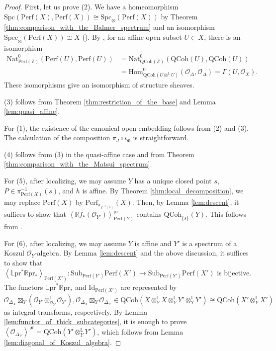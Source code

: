 \documentclass[11pt]{amsart}
\theoremstyle{definition}
\theoremstyle{plain}
\theoremstyle{remark}
\newcommand{\perf}{\mathrm{Perf}}
\newcommand{\qcoh}{\mathrm{QCoh}}
\newcommand{\Sub}{\mathrm{Sub}}
\newcommand{\mo}{\mathrm}
\newcommand{\Nat}{\mathrm{Nat}}
\newcommand{\sO}{\mathscr{O}}
\newcommand{\Hom}{\mathrm{Hom}}
\newcommand{\ld}{\mathbb{L}}
\newcommand{\rd}{\mathbb{R}}
\newcommand{\dotimes}{\otimes^{\mathbb{L}}}
\newcommand{\intg}{\mathbb{Z}}
\newcommand{\Id}{\mathrm{Id}}
\newcommand{\ang}[1]{{\left\langle{#1}\right\rangle}}
\newcommand{\oSpec}{\mathrm{Spec}_{\otimes}}
\newcommand{\Spc}{\mathrm{Spc}}
\newcommand{\oSpc}{\mathrm{Spc}_{\otimes}}
\numberwithin{equation}{section}
\begin{document}
\begin{proof}
First, let us prove (2).  
We have a homeomorphism \(\Spc(\perf(X),\perf(X))\cong \oSpc(\perf(X))\) by Theorem \ref{thm:comparison_with_the_Balmer_spectrum} and an isomorphism \(\oSpec(\perf(X))\cong X\) (\cite[Theorem 6.3]{Ba}).  
By \cite{BFN}, for an affine open subset \(U\subset X\), there is an isomorphism
\begin{align*}
\Nat^0_{\perf(\intg)}(\perf(U),\perf(U))
&= \Nat^0_{\qcoh(\intg)}(\qcoh(U),\qcoh(U))\\
&=\Hom^0_{\qcoh(U\dotimes U)}(\sO_{\Delta},\sO_{\Delta})
= \Gamma(U,\sO_X).
\end{align*}
These isomorphisms give an isomorphism of structure sheaves.

(3) follows from Theorem \ref{thm:restriction_of_the_base} and Lemma \ref{lem:quasi_affine}.

For (1), the existence of the canonical open embedding follows from (2) and (3).  
The calculation of the composition \(\pi_J\circ \iota_\Phi\) is straightforward.

(4) follows from (3) in the quasi-affine case and from 
Theorem \ref{thm:comparison_with_the_Matsui_spectrum}.

For (5), after localizing, we may assume \(Y\) has a unique closed point \(s\), 
\(P\in\pi_{\perf(X)}^{-1}(s)\), and \(h\) is affine.  
By Theorem \ref{thm:local_decomposition}, we may replace \(\perf(X)\) by \(\perf_{\pi_{f^{-1}(s)}}(X)\).  
Then, by Lemma \ref{lem:descent}, it suffices to show that 
\(\ang{\rd f_* (\sO_{Y'})}_{\perf(Y)}^{\mo{pr}}\) contains \(\qcoh_{\{s\}}(Y)\).  
This follows from \cite{Ne}.

For (6), after localizing, we may assume \(Y\) is affine and \(Y'\) is a spectrum of a Koszul \(\sO_Y\)-algebra.  
By Lemma \ref{lem:descent} and the above discussion, it suffices to show that 
\(\ang{\ld \mo{pr}^*\rd \mo{pr}_*}_{\perf(X')}:
\Sub_{\perf(Y')}\perf(X')\to \Sub_{\perf(Y')}\perf(X')\) is bijective.  
The functors \(\ld \mo{pr}^*\rd \mo{pr}_*\) and \(\Id_{\perf(X')}\) are represented by
\[\sO_{\Delta_X}\boxtimes_Y (\sO_{Y'}\dotimes_{\sO_Y}\sO_{Y'}), 
\sO_{\Delta_X}\boxtimes_Y\sO_{\Delta_{Y'}} \in 
\qcoh(X\dotimes_{Y} X\dotimes_Y Y'\dotimes_Y Y')\cong \qcoh(X'\dotimes_{Y} X')\] as integral transforms, respectively.  
By Lemma \ref{lem:functor_of_thick_subcategories}, it is enough to prove 
\(\ang{\sO_{\Delta_{Y'}}}^{\mo{pr}}=\qcoh(Y'\dotimes_Y Y')\), 
which follows from Lemma \ref{lem:diagonal_of_Koszul_algebra}.
\end{proof}
\end{document}

